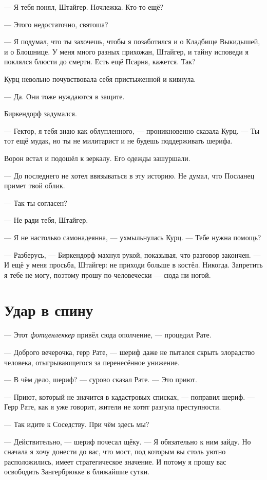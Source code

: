 --- Я тебя понял, Штайгер.
Ночлежка.
Кто-то ещё?

--- Этого недостаточно, святоша?

--- Я подумал, что ты захочешь, чтобы я позаботился и о Кладбище Выкидышей, и о Блошнице.
У меня много разных прихожан, Штайгер, и тайну исповеди я поклялся блюсти до смерти.
Есть ещё Псарня, кажется.
Так?

Курц невольно почувствовала себя пристыженной и кивнула.

--- Да.
Они тоже нуждаются в защите.

Биркендорф задумался.

--- Гектор, я тебя знаю как облупленного, --- проникновенно сказала Курц.
--- Ты тот ещё мудак, но ты не милитарист и не будешь поддерживать шерифа.

Ворон встал и подошёл к зеркалу.
Его одежды зашуршали.

--- До последнего не хотел ввязываться в эту историю.
Не думал, что Посланец примет твой облик.

--- Так ты согласен?

--- Не ради тебя, Штайгер.

--- Я не настолько самонадеянна, --- ухмыльнулась Курц.
--- Тебе нужна помощь?

--- Разберусь, --- Биркендорф махнул рукой, показывая, что разговор закончен.
--- И ещё у меня просьба, Штайгер: не приходи больше в костёл.
Никогда.
Запретить я тебе не могу, поэтому прошу по-человечески --- сюда ни ногой.

\section{Удар в спину}

--- Этот \textit{фотценлеккер} привёл сюда ополчение, --- процедил Рате.

--- Доброго вечерочка, герр Рате, --- шериф даже не пытался скрыть злорадство человека, отыгрывающегося за перенесённое унижение.

--- В чём дело, шериф? --- сурово сказал Рате.
--- Это приют.

--- Приют, который не значится в кадастровых списках, --- поправил шериф.
--- Герр Рате, как я уже говорит, жители не хотят разгула преступности.

--- Так идите к Соседству.
При чём здесь мы?

--- Действительно, --- шериф почесал щёку.
--- Я обязательно к ним зайду.
Но сначала я хочу донести до вас, что мост, под которым вы столь уютно расположились, имеет стратегическое значение.
И потому я прошу вас освободить Зангербрюкке в ближайшие сутки.

